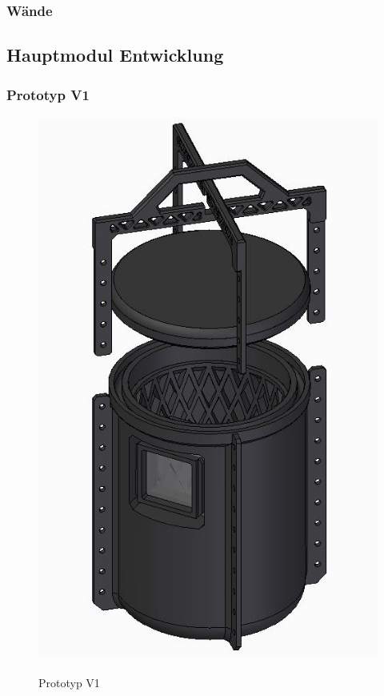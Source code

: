 \documentclass[11pt]{article}
\begin{document}
\subsubsection{Wände}
\Waende

\endgroup

\newpage
\subsection{Hauptmodul Entwicklung}
\subsubsection{Prototyp V1}
\begingroup
\begin{figure}
\centering
  \includegraphics[width=\linewidth]{Ubert1ren.jpeg}
  \caption{\\ Prototyp V1}
\end{figure}
\HauptmodulEins
\end{document}
